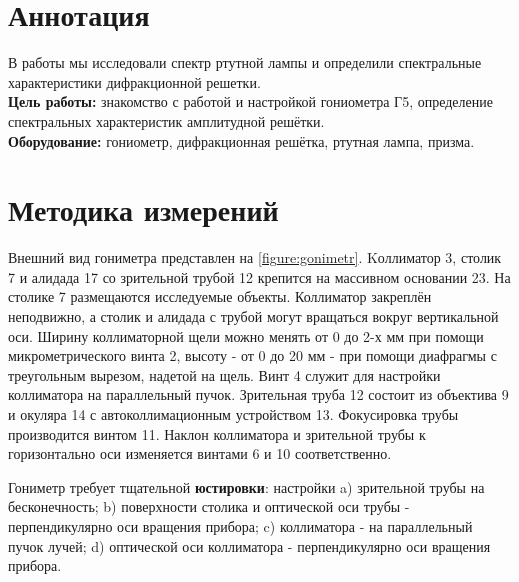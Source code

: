 \section*{Аннотация}
В работы мы исследовали спектр ртутной лампы и определили спектральные характеристики дифракционной решетки.\\\indent
\textbf{Цель работы:} знакомство с работой и настройкой гониометра Г5,
определение спектральных характеристик амплитудной решётки.\\\indent
\textbf{Оборудование:} гониометр, дифракционная решётка, ртутная лампа, призма.

\section*{Методика измерений}
Внешний вид гониметра представлен на \ref{figure:gonimetr}. Kоллиматор 3, столик 7 и алидада 17 со зрительной трубой 12 крепится на
массивном основании 23. На столике 7 размещаются исследуемые объекты.
Коллиматор закреплён неподвижно, а столик и алидада с трубой могут вращаться
вокруг вертикальной оси.
Ширину коллиматорной щели можно менять от 0 до 2-х мм при помощи
микрометрического винта 2, высоту - от 0 до 20 мм - при помощи диафрагмы с треугольным вырезом, надетой на щель. Винт 4 служит для настройки коллиматора на параллельный пучок.
Зрительная труба 12 состоит из объектива 9 и окуляра 14 с автоколлимационным
устройством 13. Фокусировка трубы производится винтом 11. Наклон коллиматора 
и зрительной трубы к горизонтально оси изменяется винтами 6 и 10 соответственно.

\indent Гониметр требует тщательной \textbf{юстировки}:
настройки
a) зрительной трубы на бесконечность;
b) поверхности столика и оптической оси трубы - перпендикулярно оси вращения прибора;
c) коллиматора - на параллельный пучок лучей;
d) оптической оси коллиматора - перпендикулярно оси вращения прибора.

